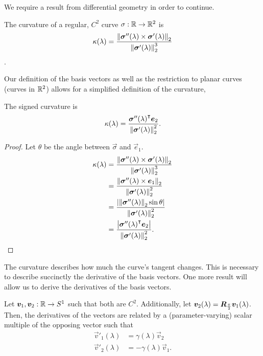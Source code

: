 We require a result from differential geometry in order to continue.
\begin{definition}[Curvature]
    The curvature of a regular, $C^2$ curve $\sigma:\mathbb{R}\to\mathbb{R}^2$ is
    \begin{equation}
        \kappa(\lambda) = \frac{\mathop{}\!\left\|\bm{\sigma}''(\lambda) \times \bm{\sigma}'(\lambda)\right\|_2}{\mathop{}\!\left\|\bm{\sigma}'(\lambda)\right\|_2^3}
    \end{equation}.
\end{definition}
Our definition of the basis vectors as well as the restriction to planar curves (curves in $\mathbb{R}^2$) allows for a simplified definition of the curvature,
\begin{lemma}
    The signed curvature is
    $$\kappa(\lambda) = \frac{{\bm{\sigma}''(\lambda)}^{\intercal}\bm{e}_2}{\mathop{}\!\left\|\bm{\sigma}'(\lambda)\right\|_2^2}.$$
    \label{lem:signed_curvature}
\end{lemma}
\begin{proof}
    Let $\theta$ be the angle between $\vec{\sigma}$ and $\vec{e}_1$.
    \begin{align*}
        \kappa(\lambda) &= \frac{\mathop{}\!\left\|\bm{\sigma}''(\lambda) \times \bm{\sigma}'(\lambda)\right\|_2}{\mathop{}\!\left\|\bm{\sigma}'(\lambda)\right\|_2^3}\\
                        &= \frac{\mathop{}\!\left\|\bm{\sigma}''(\lambda) \times \bm{e}_1\right\|_2}{\mathop{}\!\left\|\bm{\sigma}'(\lambda)\right\|_2^2}\\
                        &= \frac{\left|\mathop{}\!\left\|\bm{\sigma}''(\lambda)\right\|_2\sin \theta \right|}{\mathop{}\!\left\|\bm{\sigma}'(\lambda)\right\|_2^2}\\
                        &= \frac{\left|{\bm{\sigma}''(\lambda)}^{\intercal}\bm{e}_2\right|}{\mathop{}\!\left\|\bm{\sigma}'(\lambda)\right\|_2^2}.\\
    \end{align*}
\end{proof}
The curvature describes how much the curve's tangent changes. This is necessary to describe succinctly the derivative of the basis vectors. One more result will allow us to derive the derivatives of the basis vectors.
\begin{lemma}
    Let $\bm{v}_1, \bm{v}_2:\mathbb{R}\to S^1$ such that both are $C^2$. Additionally, let $\bm{v}_2(\lambda)=\bm{R}_{\frac{\pi}{2}}\bm{v}_1(\lambda)$. Then, the derivatives of the vectors are related by a (parameter-varying) scalar multiple of the opposing vector such that
    \begin{align*}
        \vec{v}'_1(\lambda) &= \gamma(\lambda)\vec{v}_2 \\
        \vec{v}'_2(\lambda) &= -\gamma(\lambda)\vec{v}_1.
    \end{align*}
    \label{lem:sf_frame}
\end{lemma}
